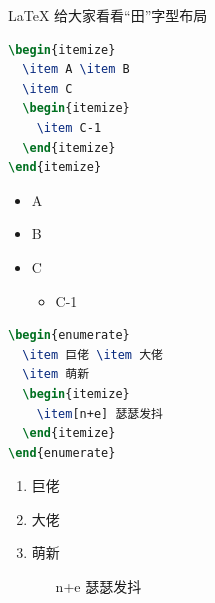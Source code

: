 \documentclass{beamer}
\begin{document}
\begin{frame}[fragile]{\LaTeX{} 给大家看看“田”字型布局}
    \begin{minipage}{0.5\linewidth}
\begin{lstlisting}[language=TeX]
\begin{itemize}
  \item A \item B
  \item C
  \begin{itemize}
    \item C-1
  \end{itemize}
\end{itemize}
\end{lstlisting}
    \end{minipage}\hspace{1cm}
    \begin{minipage}{0.3\linewidth}
        \begin{itemize}
            \item A
            \item B
            \item C
            \begin{itemize}
                \item C-1
            \end{itemize}
        \end{itemize}
    \end{minipage}
    \medskip
    \pause
    \begin{minipage}{0.5\linewidth}
\begin{lstlisting}[language=TeX]
\begin{enumerate}
  \item 巨佬 \item 大佬
  \item 萌新
  \begin{itemize}
    \item[n+e] 瑟瑟发抖
  \end{itemize}
\end{enumerate}
\end{lstlisting}
    \end{minipage}\hspace{1cm}
    \begin{minipage}{0.3\linewidth}
        \begin{enumerate}
            \item 巨佬
            \item 大佬
            \item 萌新
            \begin{itemize}
                \item[n+e] 瑟瑟发抖
            \end{itemize}
        \end{enumerate}
    \end{minipage}
\end{frame}
\end{document}
